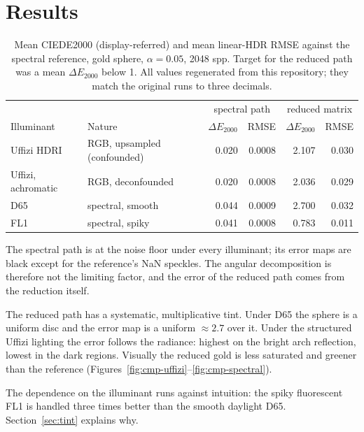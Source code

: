 \documentclass[11pt,a4paper]{article}
\newcommand{\dE}{\Delta E_{2000}}
\begin{document}
\section{Results}
\label{sec:results}

\begin{table}[h]\centering\small
\begin{tabular}{@{}llrrrr@{}}
\toprule
 & & \multicolumn{2}{c}{spectral path} & \multicolumn{2}{c}{reduced matrix} \\
Illuminant & Nature & $\dE$ & RMSE & $\dE$ & RMSE \\
\midrule
Uffizi HDRI            & RGB, upsampled (confounded) & 0.020 & 0.0008 & 2.107 & 0.030 \\
Uffizi, achromatic     & RGB, deconfounded           & 0.020 & 0.0008 & 2.036 & 0.029 \\
D65                    & spectral, smooth            & 0.044 & 0.0009 & 2.700 & 0.032 \\
FL1                    & spectral, spiky             & 0.041 & 0.0008 & 0.783 & 0.011 \\
\bottomrule
\end{tabular}
\caption{Mean CIEDE2000 (display-referred) and mean linear-HDR RMSE against
the spectral reference, gold sphere, $\alpha=0.05$, 2048 spp.  Target for the
reduced path was a mean $\dE$ below 1.  All values regenerated from this
repository; they match the original runs to three decimals.}
\label{tab:results}
\end{table}

The spectral path is at the noise floor under every illuminant; its error maps
are black except for the reference's NaN speckles.  The angular decomposition
is therefore not the limiting factor, and the error of the reduced path comes
from the reduction itself.

The reduced path has a systematic, multiplicative tint.  Under D65 the sphere
is a uniform disc and the error map is a uniform $\approx2.7$ over it.  Under
the structured Uffizi lighting the error follows the radiance: highest on the
bright arch reflection, lowest in the dark regions.  Visually the reduced gold
is less saturated and greener than the reference
(Figures~\ref{fig:cmp-uffizi}--\ref{fig:cmp-spectral}).

The dependence on the illuminant runs against intuition: the spiky fluorescent
FL1 is handled three times better than the smooth daylight D65.
Section~\ref{sec:tint} explains why.
\end{document}

